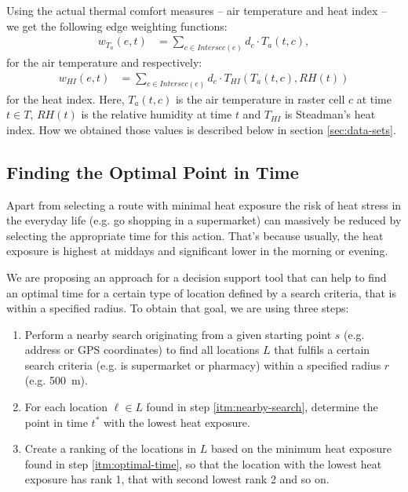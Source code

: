 Using the actual thermal comfort measures -- air temperature and heat index -- we get the following edge weighting functions:
\begin{align}
	\label{eq:edge-weight-temperature}
	w_{T_a}(e,t)& = \sum_{c \in Intersec(e)} d_c \cdot T_a(t, c),
\end{align}
for the air temperature and respectively:
\begin{align}
	\label{eq:edge-weight-heatindex}
	w_{HI}(e,t)& = \sum_{c \in Intersec(e)} d_c \cdot T_{HI}\left(T_a(t, c), RH(t)\right)
\end{align}
for the heat index. Here, $T_a(t,c)$ is the air temperature in raster cell $c$ at time $t \in T$, $RH(t)$ is the relative humidity at time $t$ and $T_{HI}$ is Steadman's heat index. How we obtained those values is described below in section \ref{sec:data-sets}.

 \subsection{Finding the Optimal Point in Time \label{sec:find-optimal-time}}
 
 Apart from selecting a route with minimal heat exposure the risk of heat stress in the everyday life (e.g. go shopping in a supermarket) can massively be reduced by selecting the appropriate time for this action. That's because usually, the heat exposure is highest at middays and significant lower in the morning or evening.
 
 We are proposing an approach for a decision support tool that can help to find an optimal time for a certain type of location defined by a search criteria, that is within a specified radius. To obtain that goal, we are using three steps:
 
 \begin{enumerate}
 	\item \label{itm:nearby-search} Perform a nearby search originating from a given starting point $s$  (e.g. address or GPS coordinates) to find all locations $L$ that fulfils a certain search criteria (e.g. is supermarket or pharmacy)  within a specified radius $r$ (e.g. \SI{500}{\meter}).
 	
 	\item \label{itm:optimal-time} For each location $\ell \in L$ found in step \ref{itm:nearby-search}, determine the point in time $t^*$ with the lowest heat exposure. 
 	
 	\item \label{itm:ranking} Create a ranking of the locations in $L$ based on the minimum heat exposure found in step \ref{itm:optimal-time}, so that the location with the lowest heat exposure has rank 1, that with second lowest rank 2 and so on.
 \end{enumerate} 

